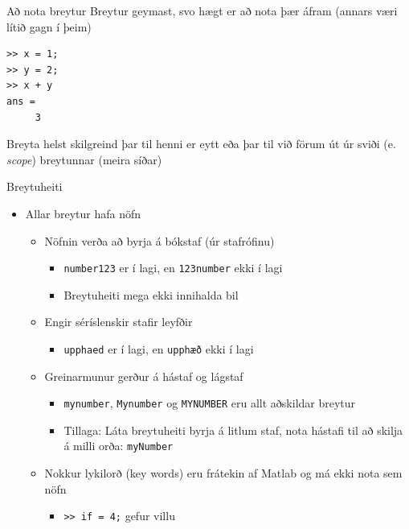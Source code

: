 \documentclass[handout]{beamer}
\begin{document}
\begin{frame}[fragile]{Að nota breytur}
Breytur geymast, svo hægt er að nota þær áfram (annars væri lítið gagn í þeim)
\begin{verbatim}
>> x = 1;
>> y = 2;
>> x + y
ans =
     3
\end{verbatim}
Breyta helst skilgreind þar til henni er eytt eða þar til við förum út úr sviði (e. \emph{scope}) breytunnar (meira síðar)
\end{frame}

\begin{frame}{Breytuheiti}
\begin{itemize}
 \item Allar breytur hafa nöfn
 \begin{itemize}
  \item Nöfnin verða að byrja á bókstaf (úr stafrófinu)
  \begin{itemize}
   \item \texttt{number123} er í lagi, en  \texttt{123number}  ekki í lagi
   \item Breytuheiti mega ekki innihalda bil
  \end{itemize}
  \item Engir séríslenskir stafir leyfðir
  \begin{itemize}
   \item \texttt{upphaed}  er í lagi, en  \texttt{upphæð}  ekki í lagi
  \end{itemize}
  \item Greinarmunur gerður á hástaf og lágstaf
  \begin{itemize}
   \item \texttt{mynumber}, \texttt{Mynumber} og \texttt{MYNUMBER} eru allt aðskildar breytur
   \item Tillaga: Láta breytuheiti byrja á litlum staf, nota hástafi til að skilja á milli orða: \texttt{myNumber}
  \end{itemize}
  \item Nokkur lykilorð (key words) eru frátekin af Matlab og má ekki nota sem nöfn
  \begin{itemize}
   \item \texttt{>> if = 4;}    gefur villu
  \end{itemize}
 \end{itemize}
\end{itemize}
\end{frame}
\end{document}

